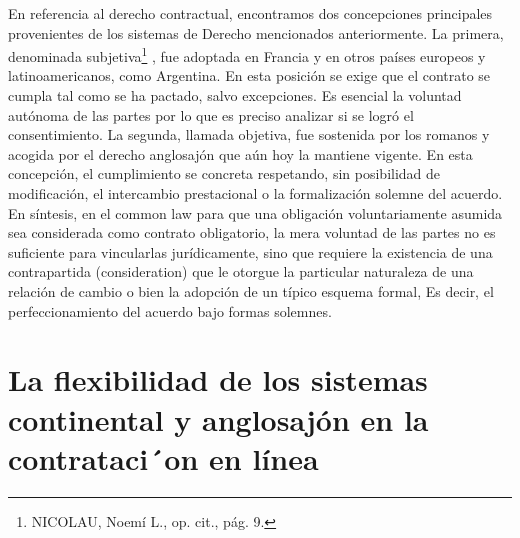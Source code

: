 \documentclass[12pt]{report} %
\begin{document}
\begin{itemize}
En referencia al derecho contractual, encontramos dos concepciones principales provenientes de los sistemas de Derecho mencionados anteriormente. La primera, denominada subjetiva\footnote{NICOLAU, Noemí L., op. cit., pág. 9.} , fue adoptada en Francia y en otros países  europeos  y  latinoamericanos,  como  Argentina.  En  esta posición  se exige que el contrato se cumpla tal como se ha pactado, salvo excepciones. Es esencial  la voluntad autónoma  de las partes  por lo que es preciso analizar si se logró el consentimiento. La segunda, llamada objetiva, fue sostenida por los romanos y acogida por el derecho anglosajón que aún hoy la mantiene vigente. En esta concepción, el cumplimiento se concreta respetando, sin posibilidad de modificación, el intercambio prestacional o la formalización solemne del acuerdo. En síntesis, en el common law para que una obligación voluntariamente asumida sea considerada como contrato obligatorio, la mera voluntad de las partes no es suficiente para vincularlas jurídicamente, sino que requiere la existencia de una contrapartida (consideration) que le otorgue la particular naturaleza de una relación de cambio o bien la adopción de un típico esquema formal, Es decir, el perfeccionamiento del acuerdo bajo formas solemnes. 

\section{La flexibilidad de los sistemas continental y anglosajón en  la  contrataci´on  en línea}


\end{itemize}
\end{document}

